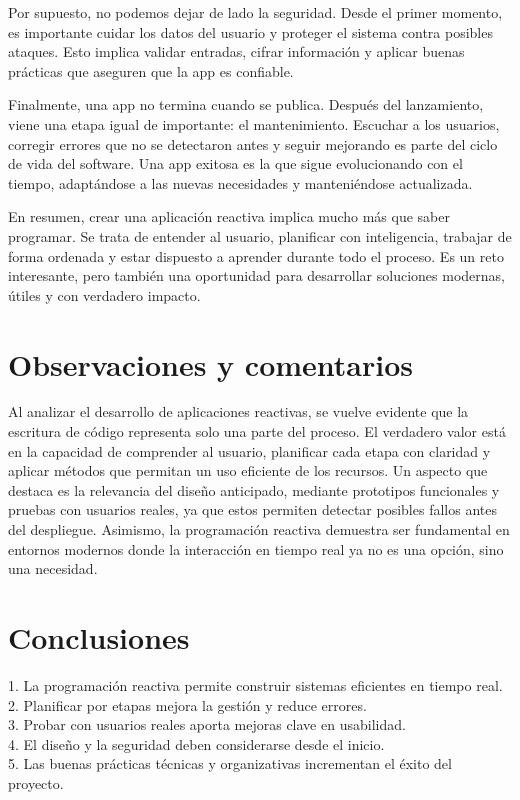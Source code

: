 \documentclass[12pt,letterpaper]{article}
\begin{document}
Por supuesto, no podemos dejar de lado la seguridad. Desde el primer momento, es importante cuidar los datos del usuario y proteger el sistema contra posibles ataques. Esto implica validar entradas, cifrar información y aplicar buenas prácticas que aseguren que la app es confiable.

Finalmente, una app no termina cuando se publica. Después del lanzamiento, viene una etapa igual de importante: el mantenimiento. Escuchar a los usuarios, corregir errores que no se detectaron antes y seguir mejorando es parte del ciclo de vida del software. Una app exitosa es la que sigue evolucionando con el tiempo, adaptándose a las nuevas necesidades y manteniéndose actualizada.

En resumen, crear una aplicación reactiva implica mucho más que saber programar. Se trata de entender al usuario, planificar con inteligencia, trabajar de forma ordenada y estar dispuesto a aprender durante todo el proceso. Es un reto interesante, pero también una oportunidad para desarrollar soluciones modernas, útiles y con verdadero impacto.
\section*{Observaciones y comentarios}
Al analizar el desarrollo de aplicaciones reactivas, se vuelve evidente que la escritura de código representa solo una parte del proceso. El verdadero valor está en la capacidad de comprender al usuario, planificar cada etapa con claridad y aplicar métodos que permitan un uso eficiente de los recursos. Un aspecto que destaca es la relevancia del diseño anticipado, mediante prototipos funcionales y pruebas con usuarios reales, ya que estos permiten detectar posibles fallos antes del despliegue. Asimismo, la programación reactiva demuestra ser fundamental en entornos modernos donde la interacción en tiempo real ya no es una opción, sino una necesidad.

\section*{Conclusiones}
1. La programación reactiva permite construir sistemas eficientes en tiempo real.\\
2. Planificar por etapas mejora la gestión y reduce errores.\\
3. Probar con usuarios reales aporta mejoras clave en usabilidad.\\
4. El diseño y la seguridad deben considerarse desde el inicio.\\
5. Las buenas prácticas técnicas y organizativas incrementan el éxito del proyecto.
\end{document}
